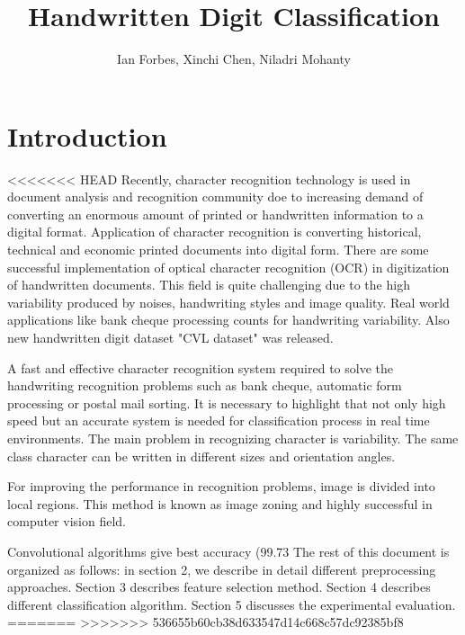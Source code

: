 \documentclass[10pt,twocolumn]{article}
\title{Handwritten Digit Classification}
\author{Ian Forbes, Xinchi Chen, Niladri Mohanty}
\begin{document}
\section{Introduction}
<<<<<<< HEAD
Recently, character recognition technology is used in document analysis and recognition community doe to increasing demand of converting an enormous amount of printed or handwritten information to a digital format. Application of character recognition is converting historical, technical and economic printed documents into digital form. There are some successful implementation of optical character recognition (OCR) in digitization of handwritten documents. This field is quite challenging due to the high variability produced by noises, handwriting styles and image quality. Real world applications like bank cheque processing counts for handwriting variability. \cite {diem2013icdar} Also new handwritten digit dataset "CVL dataset" was released. 

\cite {liu2003handwritten} A fast and effective character recognition system required to solve the handwriting recognition problems such as bank cheque, automatic form processing or postal mail sorting. It is necessary to highlight that not only high speed but an accurate system is needed for classification process in real time environments. The main problem in recognizing character is variability. The same class character can be written in different sizes and orientation angles.

For improving the performance in recognition problems, image is divided into local regions. \cite {lazebnik2006beyond} This method is known as image zoning and highly successful in computer vision field.

\cite {ciresan2012multi} Convolutional algorithms give best accuracy (99.73%
The rest of this document is organized as follows: in section 2, we describe in detail different preprocessing approaches. Section 3 describes feature selection method. Section 4 describes different classification algorithm. Section 5 discusses the experimental evaluation.
=======
>>>>>>> 536655b60cb38d633547d14c668c57dc92385bf8
\end{document}
